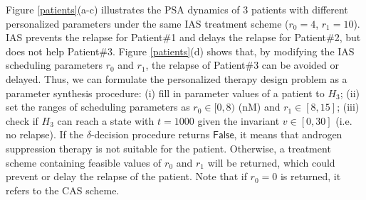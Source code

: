 Figure \ref{patients}(a-c) illustrates the PSA dynamics of $3$ patients with different personalized parameters under the same IAS treatment scheme ($r_0=4$, $r_1=10$). IAS prevents the relapse for Patient\#1 and delays the relapse for Patient\#2, but does not help Patient\#3. Figure \ref{patients}(d) shows that, by modifying the IAS scheduling parameters $r_0$ and $r_1$, the relapse of Patient\#3 can be avoided or delayed. Thus, we can formulate the personalized therapy design problem as a parameter synthesis procedure: (i) fill in parameter values of a patient to $H_3$; (ii) set the ranges of scheduling parameters as $r_0 \in [0,8)$ (nM) and $r_1 \in [8,15]$; (iii) check if $H_3$ can reach a state with $t=1000$ given the invariant $v \in [0,30]$ (i.e. no relapse). If the $\delta$-decision procedure returns $\mathsf{False}$, it means that androgen suppression therapy is not suitable for the patient. Otherwise, a treatment scheme containing feasible values of $r_0$ and $r_1$ will be returned, which could prevent or delay the relapse of the patient. Note that if $r_0=0$ is returned, it refers to the CAS scheme.


